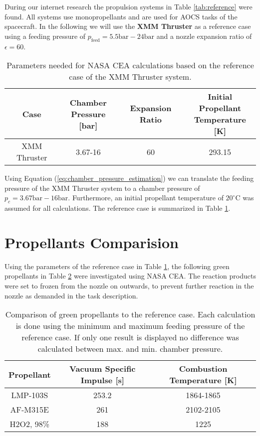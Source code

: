 \documentclass[12pt]{article}
\begin{document}
During our internet research the propulsion systems in Table \ref{tab:reference} were found. All systems use monopropellants and are used for AOCS tasks of the spacecraft. In the following we will use the \textbf{XMM Thruster} as a reference case using a feeding pressure of $p_{\text{feed}}=5.5\text{bar}-24\text{bar}$ and a nozzle expansion ratio of $\epsilon=60$.\\

\begin{table}[h!]
	\centering
	\begin{tabular}{|c|c|c|c|}
		\hline
		Case & \makecell{Chamber\\ Pressure {[}bar{]}} & Expansion Ratio & \makecell{Initial Propellant\\ Temperature {[}K{]}} \\ \hline
		XMM Thruster                      &        3.67-16         &  60   &              293.15                      \\ \hline
	\end{tabular}
	\caption{Parameters needed for NASA CEA calculations based on the reference case of the XMM Thruster system.}
	\label{tab:selected_reference_case}
\end{table}

Using Equation (\ref{eq:chamber_pressure_estimation}) we can translate the feeding pressure of the XMM Thruster system to a chamber pressure of $p_{c}=3.67\text{bar}-16\text{bar}$. Furthermore, an initial propellant temperature of $20^\circ\text{C}$ was assumed for all calculations. The reference case is summarized in Table \ref{tab:selected_reference_case}.
 
\section{Propellants Comparision}
Using the parameters of the reference case in Table \ref{tab:selected_reference_case}, the following green propellants in Table \ref{tab:comparison} were investigated using NASA CEA. The reaction products were set to frozen from the nozzle on outwards, to prevent further reaction in the nozzle as demanded in the task description.

\begin{table}[!h]
	\centering
	\begin{tabular}{|c|c|c|}
		\hline
		Propellant & Vacuum Specific Impulse {[}s{]} & Combustion Temperature {[}K{]} \\ \hline
		LMP-103S   & 253.2 & 1864-1865  \\ \hline
		AF-M315E   & 261  & 2102-2105  \\ \hline
		H2O2, 98\% & 188   & 1225    \\ \hline     
	\end{tabular}\\
	\caption{Comparison of green propellants to the reference case. Each calculation is done using the minimum and maximum feeding pressure of the reference case. If only one result is displayed no difference was calculated between max. and min. chamber pressure.}
	\label{tab:comparison}
\end{table}
\end{document}
